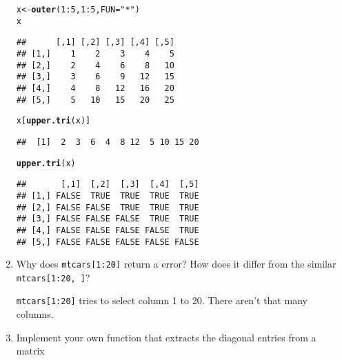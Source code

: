 \documentclass{article}\usepackage[]{graphicx}\usepackage[]{color}
\makeatletter
\newcommand{\hlnum}[1]{\textcolor[rgb]{0.686,0.059,0.569}{#1}}%
\newcommand{\hlstr}[1]{\textcolor[rgb]{0.192,0.494,0.8}{#1}}%
\newcommand{\hlopt}[1]{\textcolor[rgb]{0,0,0}{#1}}%
\newcommand{\hlstd}[1]{\textcolor[rgb]{0.345,0.345,0.345}{#1}}%
\newcommand{\hlkwb}[1]{\textcolor[rgb]{0.69,0.353,0.396}{#1}}%
\newcommand{\hlkwc}[1]{\textcolor[rgb]{0.333,0.667,0.333}{#1}}%
\newcommand{\hlkwd}[1]{\textcolor[rgb]{0.737,0.353,0.396}{\textbf{#1}}}%
\newenvironment{kframe}{%
 \def\at@end@of@kframe{}%
 \ifinner\ifhmode%
  \def\at@end@of@kframe{\end{minipage}}%
  \begin{minipage}{\columnwidth}%
 \fi\fi%
 \def\FrameCommand##1{\hskip\@totalleftmargin \hskip-\fboxsep
 \colorbox{shadecolor}{##1}\hskip-\fboxsep
     \hskip-\linewidth \hskip-\@totalleftmargin \hskip\columnwidth}%
 \MakeFramed {\advance\hsize-\width
   \@totalleftmargin\z@ \linewidth\hsize
   \@setminipage}}%
 {\par\unskip\endMakeFramed%
 \at@end@of@kframe}
\newenvironment{knitrout}{}{} %
\makeatother
\begin{document}
\begin{enumerate}
\begin{knitrout}
\color{fgcolor}\begin{kframe}
\begin{alltt}
\hlstd{x} \hlkwb{<-} \hlkwd{outer}\hlstd{(}\hlnum{1}\hlopt{:}\hlnum{5}\hlstd{,} \hlnum{1}\hlopt{:}\hlnum{5}\hlstd{,} \hlkwc{FUN}\hlstd{=}\hlstr{"*"}\hlstd{)}
\hlstd{x}
\end{alltt}
\begin{verbatim}
##      [,1] [,2] [,3] [,4] [,5]
## [1,]    1    2    3    4    5
## [2,]    2    4    6    8   10
## [3,]    3    6    9   12   15
## [4,]    4    8   12   16   20
## [5,]    5   10   15   20   25
\end{verbatim}
\begin{alltt}
\hlstd{x[}\hlkwd{upper.tri}\hlstd{(x)]}
\end{alltt}
\begin{verbatim}
##  [1]  2  3  6  4  8 12  5 10 15 20
\end{verbatim}
\begin{alltt}
\hlkwd{upper.tri}\hlstd{(x)}
\end{alltt}
\begin{verbatim}
##       [,1]  [,2]  [,3]  [,4]  [,5]
## [1,] FALSE  TRUE  TRUE  TRUE  TRUE
## [2,] FALSE FALSE  TRUE  TRUE  TRUE
## [3,] FALSE FALSE FALSE  TRUE  TRUE
## [4,] FALSE FALSE FALSE FALSE  TRUE
## [5,] FALSE FALSE FALSE FALSE FALSE
\end{verbatim}
\end{kframe}
\end{knitrout}

\item Why does \verb`mtcars[1:20]` return a error? How does it differ from the similar \verb`mtcars[1:20, ]`?

\verb`mtcars[1:20]` tries to select column 1 to 20. There aren't that many columns.

\item Implement your own function that extracts the diagonal entries from a matrix


\end{enumerate}
\end{document}
